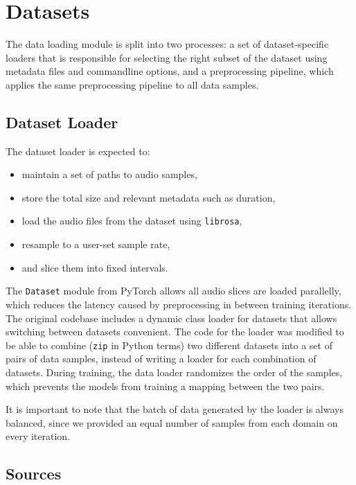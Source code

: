 \documentclass[12pt,a4paper,]{report}
\providecommand{\tightlist}{%
  \setlength{\itemsep}{0pt}\setlength{\parskip}{0pt}}
\begin{document}
\hypertarget{datasets}{%
\section{Datasets}\label{datasets}}

The data loading module is split into two processes: a set of
dataset-specific loaders that is responsible for selecting the right
subset of the dataset using metadata files and commandline options, and
a preprocessing pipeline, which applies the same preprocessing pipeline
to all data samples.

\hypertarget{dataset-loader}{%
\subsection{Dataset Loader}\label{dataset-loader}}

The dataset loader is expected to:

\begin{itemize}
\tightlist
\item
  maintain a set of paths to audio samples,
\item
  store the total size and relevant metadata such as duration,
\item
  load the audio files from the dataset using \texttt{librosa},
\item
  resample to a user-set sample rate,
\item
  and slice them into fixed intervals.
\end{itemize}

The \texttt{Dataset} module from PyTorch allows all audio slices are
loaded parallelly, which reduces the latency caused by preprocessing in
between training iterations. The original codebase includes a dynamic
class loader for datasets that allows switching between datasets
convenient. The code for the loader was modified to be able to combine
(\texttt{zip} in Python terms) two different datasets into a set of
pairs of data samples, instead of writing a loader for each combination
of datasets. During training, the data loader randomizes the order of
the samples, which prevents the models from training a mapping between
the two pairs.

It is important to note that the batch of data generated by the loader
is always balanced, since we provided an equal number of samples from
each domain on every iteration.

\hypertarget{sources}{%
\subsection{Sources}\label{sources}}
\end{document}
